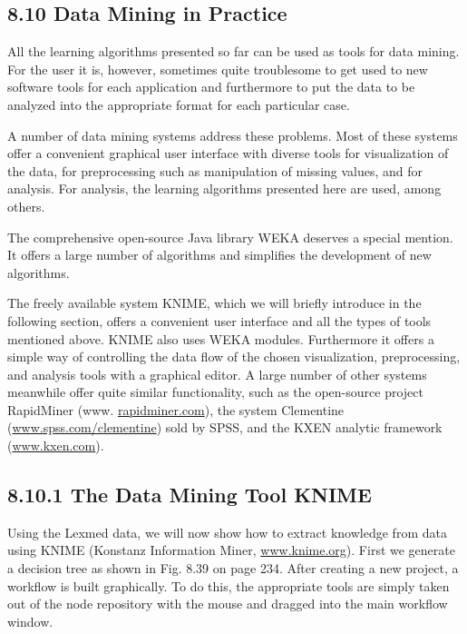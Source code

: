 \documentclass[10pt]{article}
\begin{document}
\subsection*{8.10 Data Mining in Practice}
All the learning algorithms presented so far can be used as tools for data mining. For the user it is, however, sometimes quite troublesome to get used to new software tools for each application and furthermore to put the data to be analyzed into the appropriate format for each particular case.

A number of data mining systems address these problems. Most of these systems offer a convenient graphical user interface with diverse tools for visualization of the data, for preprocessing such as manipulation of missing values, and for analysis. For analysis, the learning algorithms presented here are used, among others.

The comprehensive open-source Java library WEKA deserves a special mention. It offers a large number of algorithms and simplifies the development of new algorithms.

The freely available system KNIME, which we will briefly introduce in the following section, offers a convenient user interface and all the types of tools mentioned above. KNIME also uses WEKA modules. Furthermore it offers a simple way of controlling the data flow of the chosen visualization, preprocessing, and analysis tools with a graphical editor. A large number of other systems meanwhile offer quite similar functionality, such as the open-source project RapidMiner (www. \href{http://rapidminer.com}{rapidminer.com}), the system Clementine (\href{http://www.spss.com/clementine}{www.spss.com/clementine}) sold by SPSS, and the KXEN analytic framework (\href{http://www.kxen.com}{www.kxen.com}).

\subsection*{8.10.1 The Data Mining Tool KNIME}
Using the Lexmed data, we will now show how to extract knowledge from data using KNIME (Konstanz Information Miner, \href{http://www.knime.org}{www.knime.org}). First we generate a decision tree as shown in Fig. 8.39 on page 234. After creating a new project, a workflow is built graphically. To do this, the appropriate tools are simply taken out of the node repository with the mouse and dragged into the main workflow window.
\end{document}

